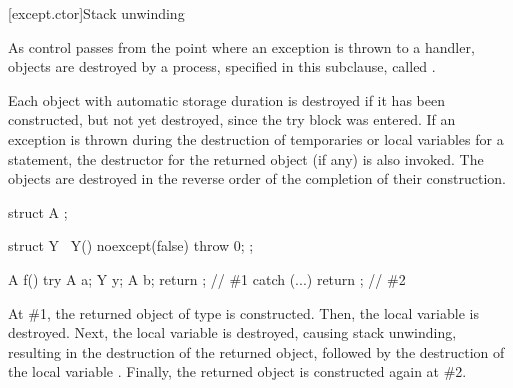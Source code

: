 [except.ctor]{Stack unwinding}%
%
%

\pnum
{}%
As control passes from the point where an exception is thrown
to a handler,
objects are destroyed by a process,
specified in this subclause, called .

\pnum
Each object with automatic storage duration is destroyed if it has been
constructed, but not yet destroyed,
since the try block was entered.
If an exception is thrown during the destruction of temporaries or
local variables for a  statement,
the destructor for the returned object (if any) is also invoked.
The objects are destroyed in the reverse order of the completion
of their construction.
\begin{example}
\begin{codeblock}
struct A { };

struct Y { ~Y() noexcept(false) { throw 0; } };

A f() {
  try {
    A a;
    Y y;
    A b;
    return {};      // \#1
  } catch (...) {
  }
  return {};        // \#2
}
\end{codeblock}
At \#1, the returned object of type  is constructed.
Then, the local variable  is destroyed.
Next, the local variable  is destroyed,
causing stack unwinding,
resulting in the destruction of the returned object,
followed by the destruction of the local variable .
Finally, the returned object is constructed again at \#2.
\end{example}

